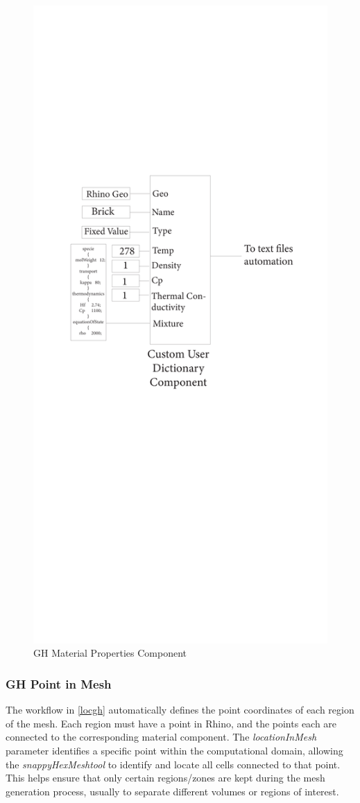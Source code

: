 \begin{figure}[h!]
\centering
\includegraphics[trim=5cm 32cm 4.5cm 7cm, clip, width=0.55\linewidth]{Figures/THESISGH2.pdf}
\hspace{0.7cm}
\caption{\gls{GH} Material Properties Component}
\label{matgh}
\end{figure}





\subsubsection{\gls{GH} Point in Mesh}
The workflow in \ref{locgh} automatically defines the point coordinates of each region of the mesh. Each region must have a point in Rhino, and the points each are connected to the corresponding material component. The \textit{locationInMesh} parameter identifies a specific point within the computational domain, allowing the \textit{snappyHexMeshtool} to identify and locate all cells connected to that point. This helps ensure that only certain regions/zones are kept during the mesh generation process, usually to separate different volumes or regions of interest.

